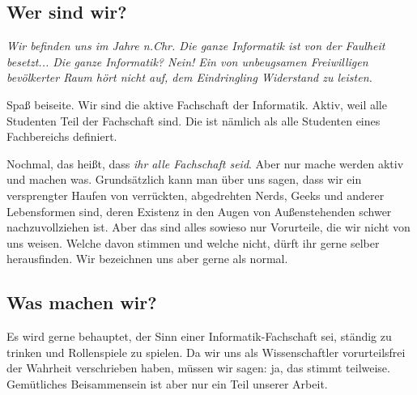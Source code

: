 
\subsection{Wer sind wir?}
    \glqq\textit{Wir befinden uns im Jahre \the\year{} n.Chr. Die ganze Informatik ist von der Faulheit besetzt... Die ganze Informatik? Nein! Ein von unbeugsamen Freiwilligen bevölkerter Raum hört nicht auf, dem Eindringling  Widerstand zu leisten.} \grqq

    Spaß beiseite. Wir sind die aktive Fachschaft der Informatik. Aktiv, weil alle Studenten Teil der Fachschaft sind. Die ist n\"amlich als alle Studenten eines Fachbereichs definiert.

    Nochmal, das hei{\ss}t, dass \emph{ihr alle Fachschaft seid}. Aber nur mache werden aktiv und machen was. %
    Grunds\"atzlich kann man \"uber uns sagen, dass wir ein versprengter Haufen von verrückten, abgedrehten Nerds, Geeks und anderer Lebensformen sind, deren Existenz in den Augen von Au{\ss}enstehenden schwer nachzuvollziehen ist.
    Aber das sind alles sowieso nur Vorurteile, die wir nicht von uns weisen. Welche davon stimmen und welche nicht, dürft ihr gerne selber herausfinden. Wir bezeichnen uns aber gerne als normal.



\subsection{Was machen wir?}
    Es wird gerne behauptet, der Sinn einer Informatik-Fachschaft sei, st\"andig zu trinken und Rollenspiele zu spielen.
    Da wir uns als Wissenschaftler vorurteilsfrei der Wahrheit verschrieben haben, m\"ussen wir sagen: ja, das stimmt teilweise.
    Gem\"utliches Beisammensein ist aber nur ein Teil unserer Arbeit.

